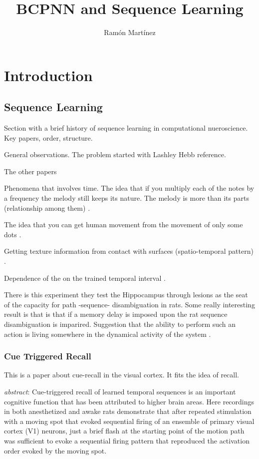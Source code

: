 \documentclass[10pt,a4paper]{article}
\author{Ram\'on Mart\'inez}
\title{BCPNN and Sequence Learning}
\begin{document}
\maketitle

\section{Introduction}

\subsection{Sequence Learning}
Section with a brief history of sequence learning in computational nueroscience. Key papers, order, structure. 

General observations.
The problem started with Lashley \cite{lashley1951problem} Hebb reference. 

The other papers

Phenomena that involves time.
The idea that if you multiply each of the notes by a frequency the melody still keeps its nature. The melody is more than its parts (relationship among them) \cite{von1988gestalt}. 

The idea that you can get human movement from the movement of only some dots \cite{johansson1973visual}. 

Getting texture information from contact with surfaces (spatio-temporal pattern) \cite{weber2013spatial}. 

Dependence of the on the trained temporal interval
\cite{johnson2010neural}.

There is this experiment they test the Hippocampus through lesions as the seat of the capacity for path -sequence- disambiguation in rats. Some really interesting result is that is that if a memory delay is imposed upon the rat sequence disambiguation is imparired. Suggestion that the ability to perform such an action is living somewhere in the dynamical activity of the system \cite{agster2002hippocampus}. 

\subsubsection*{Cue Triggered Recall}

This is a paper about cue-recall in the visual cortex. It fits the idea of recall. 

\textit{abstract}: Cue-triggered recall of learned temporal sequences is an important cognitive function that has been attributed to higher brain areas. Here recordings in both anesthetized and awake rats demonstrate that after repeated stimulation with a moving spot that evoked sequential firing of an ensemble of primary visual cortex (V1) neurons, just a brief flash at the starting point of the motion path was sufficient to evoke a sequential firing pattern that reproduced the activation order evoked by the moving spot.
\end{document}
